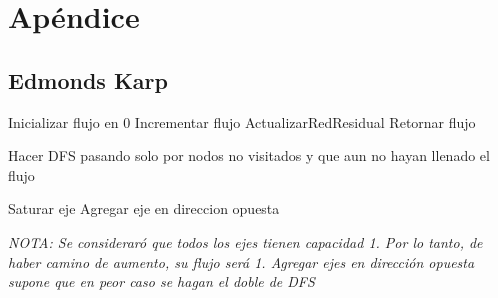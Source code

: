 \documentclass[10pt,a4paper]{article}
\begin{document}

\fecha{\today}



\maketitle

\newpage
\thispagestyle{empty}
\vfill
\vspace{3cm}
\tableofcontents
\newpage
\setcounter{page}{1}


\newpage

\newpage

\newpage

\newpage
\section{Apéndice}
\subsection{Edmonds Karp}\label{edmkarp}
\begin{algorithmic}
	\State Inicializar flujo en 0
		\State Incrementar flujo
		\State ActualizarRedResidual
	\EndWhile
	\State Retornar flujo
\end{algorithmic}
\vspace{1em}
\begin{algorithmic}
	\State Hacer DFS pasando solo por nodos no visitados y que aun no hayan llenado el flujo
\EndFunction

		\State Saturar eje
		\State Agregar eje en direccion opuesta
	\EndFor
\EndFunction
\end{algorithmic}

\emph{NOTA: Se consideraró que todos los ejes tienen capacidad 1. Por lo tanto, de haber camino de aumento, su flujo será 1. Agregar ejes en dirección opuesta supone que en peor caso se hagan el doble de DFS}



\end{document}
